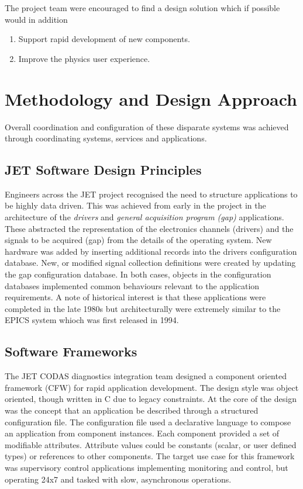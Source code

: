 \documentclass[preprint,12pt]{elsarticle}
\begin{document}
The project team were encouraged to find a design solution which
if possible would in addition

\begin{enumerate}
	\item{Support rapid development of new components.}
	\item{Improve the physics user experience.}
\end{enumerate}

\section{Methodology and Design Approach}



Overall coordination and configuration of these disparate systems was achieved through coordinating systems, services
and applications.

\subsection{JET Software Design Principles}

Engineers across the JET project recognised the need to structure applications to be highly data driven.
This was achieved from early in the project in the architecture of the {\em drivers} and {\em general acquisition program (gap)} applications.
These abstracted the representation of the electronics channels (drivers) and the signals to be acquired (gap) 
from the details of the operating system.  New hardware was added by inserting additional records into 
the drivers configuration database.  New, or modified signal collection definitions
were created by updating the gap configuration database.  In both cases, objects in the 
configuration databases implemented common behaviours relevant to the application requirements.
A note of historical interest is that these applications were completed in the late 1980s
but architecturally were extremely similar to the EPICS system whioch was first released in 1994.

\subsection{Software Frameworks}

The JET CODAS diagnostics integration team designed a component oriented framework (CFW)
for rapid application development. The design style was object oriented, though
written in C due to legacy constraints.  At the core of the design was the concept
that an application be described through a structured configuration file.
The configuration file used a declarative language to compose an application
from component instances. Each component provided a set of modifiable attributes.
Attribute values could be constants (scalar, or user defined types) or 
references to other components.  The target use case for this framework was supervisory
control applications implementing monitoring and control, but operating 24x7 and 
tasked with slow, asynchronous operations.
\end{document}
